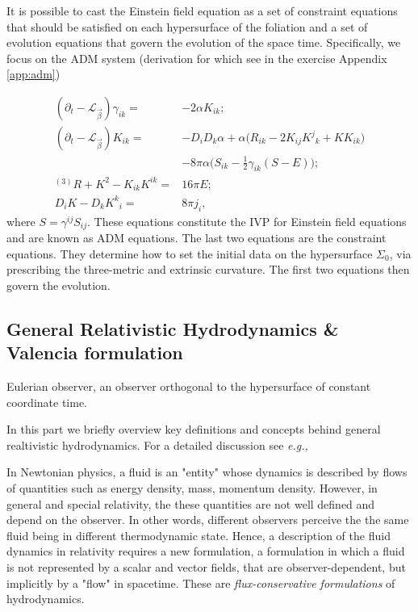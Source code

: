 \documentclass[11pt,a4paper,headinclude=true,DIV=14,BCOR=8mm,chapterprefix,listof=totoc,twoside,openright,abstracton]{scrbook}
\begin{document}
It is possible to cast the Einstein field equation as a set of constraint equations that should be satisfied on each hypersurface of the foliation and a set of evolution equations that govern the evolution of the space time.
Specifically, we focus on the ADM system (derivation for which see in the exercise Appendix \ref{app:adm})

\begin{align}
(\partial_t - \mathcal{L}_{\vec{\beta}})\gamma_{ik} =& -2\alpha K_{ik}; \\
(\partial_t - \mathcal{L}_{\vec{\beta}})K_{ik} =& -D_{i}D_{k}\alpha + \alpha\big(R_{ik} - 2K_{ij}{K^j}_k+KK_{ik}\big) \\
& - 8\pi\alpha\big(S_{ik} - \frac{1}{2}\gamma_{ik}(S-E)\big); \\
{^{(3)}R} + K^2 - K_{ik}K^{ik} =& 16\pi E; \\
D_{i}K-D_{k}{K^k}_i =& 8\pi j_i,
\label{eq:theory:adm}
\end{align}
where $S = \gamma^{ij}S_{ij}$.
These equations constitute the IVP for Einstein field equations and are known as ADM equations. The last two equations are the constraint equations. They determine how to set the initial data on the hypersurface $\Sigma_0$, via prescribing the three-metric and extrinsic curvature. The first two equations then govern the evolution.


\subsection{General Relativistic Hydrodynamics \& Valencia formulation}



Eulerian observer, an observer orthogonal to the hypersurface of constant coordinate time.

In this part we briefly overview key definitions and concepts behind general realtivistic hydrodynamics. For a detailed discussion see \textit{e.g.,} \cite{Misner:1973,Schutz:2009a,Gourgoulhon:2006bn,Andersson:2006nr,Rezzolla:2013}


In Newtonian physics, a fluid is an "entity" whose dynamics is described by flows of quantities such as energy density, mass, momentum density. However, in general and special relativity, the these quantities are not well defined and depend on the observer. In other words, different observers perceive the the same fluid being in different thermodynamic state. Hence, a description of the fluid dynamics in relativity requires a new formulation, a formulation in which a fluid is not represented by a scalar and vector fields, that are observer-dependent, but implicitly by a "flow" in spacetime. These are \textit{flux-conservative formulations} of hydrodynamics.
\end{document}
